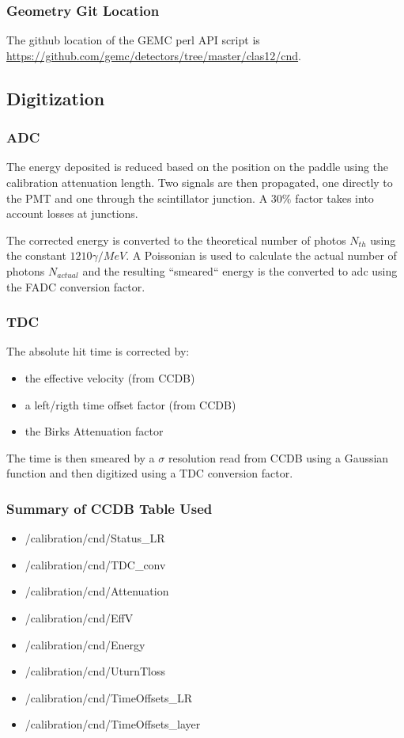 \subsubsection{Geometry Git Location}
The github location of the GEMC perl API script is \url{https://github.com/gemc/detectors/tree/master/clas12/cnd}.


\subsection{Digitization}

\subsubsection{ADC}

The energy deposited is reduced based on the position on the paddle using the calibration attenuation length. Two signals are then propagated, one directly
to the PMT and one through the scintillator junction. A $30\%$ factor takes into account losses at junctions.

The corrected energy is converted to the theoretical number of photos $N_{th}$ using the constant $1210 \gamma / MeV $. A Poissonian is used to
calculate the actual number of photons $N_{actual}$ and the resulting ``smeared`` energy is the converted to adc using the FADC conversion factor.

\subsubsection{TDC}

The absolute hit time is corrected by:

\begin{itemize}
	\item the effective velocity (from CCDB)
	\item a left/rigth time offset factor (from CCDB)
	\item the Birks Attenuation factor
\end{itemize}

The time is then smeared by a $\sigma$ resolution read from CCDB using a Gaussian function and then digitized using a TDC conversion factor.


\subsubsection{Summary of CCDB Table Used}
\begin{itemize}
	\item /calibration/cnd/Status\_LR
	\item /calibration/cnd/TDC\_conv
	\item /calibration/cnd/Attenuation
	\item /calibration/cnd/EffV
	\item /calibration/cnd/Energy
	\item /calibration/cnd/UturnTloss
	\item /calibration/cnd/TimeOffsets\_LR
	\item /calibration/cnd/TimeOffsets\_layer
\end{itemize}



